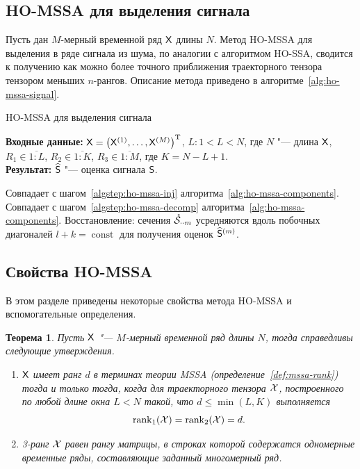 \documentclass[specialist,
  substylefile=spbu_report.rtx,
subf,href,colorlinks=true, 12pt]{disser}
\theoremstyle{plain}
\newtheorem{theorem}{Теорема}
\theoremstyle{definition}
\theoremstyle{remark}
\newcommand{\Input}{\textbf{Входные данные: }}
\newcommand{\Output}{\textbf{Результат: }}
\begin{document}
\subsection{HO-MSSA для выделения сигнала}
\label{subsec:ho-mssa-desc-signal}
Пусть дан $M$-мерный временной ряд $\mathsf{X}$ длины $N$.
Метод HO-MSSA для выделения в ряде сигнала из шума, по аналогии с
алгоритмом HO-SSA, сводится к получению как можно более точного
приближения траекторного тензора тензором меньших $n$-рангов.
Описание метода приведено в алгоритме~\ref{alg:ho-mssa-signal}.

\begin{algorithm}[!ht]
  \caption{HO-MSSA для выделения сигнала}
  \label{alg:ho-mssa-signal}
  \Input $\mathsf{X} = \left(\mathsf{X}^{(1)}, \ldots, \mathsf{X}^{(M)}\right)^{\mathrm{T}}$,
  $L: 1< L < N$, где $N$ "--- длина $\mathsf{X}$, $R_1 \in \overline{1:L}$,
  $R_2 \in \overline{1:K}$, $R_3 \in \overline{1:M}$, где $K = N-L+1$.\\
  \Output $\widehat{\mathsf{S}}$ "--- оценка сигнала $\mathsf{S}$.
  \begin{algorithmic}[1]
    \State Совпадает с шагом~\ref{algstep:ho-mssa-inj}
    алгоритма~\ref{alg:ho-mssa-components}.
    \State Совпадает с шагом~\ref{algstep:ho-mssa-decomp}
    алгоритма~\ref{alg:ho-mssa-components}.
    \State \label{algstep:ho-mssa-signal-reverse}
    Восстановление:
    сечения $\mathring{\mathcal{S}}_{\cdot\cdot m}$ усредняются вдоль
    побочных диагоналей $l + k = \operatorname{const}$ для
    получения оценок $\widehat{\mathsf{S}}^{(m)}$.
  \end{algorithmic}
\end{algorithm}

\subsection{Свойства HO-MSSA}
В этом разделе приведены некоторые свойства метода HO-MSSA и
вспомогательные определения.

\begin{theorem}
  \label{state:hosvd-mssa-rang}
  Пусть $\mathsf{X}$ "--- $M$-мерный временной ряд длины $N$, тогда
  справедливы следующие утверждения.
  \begin{enumerate}
    \item $\mathsf{X}$ имеет ранг $d$ в терминах теории \emph{MSSA}
      (определение~\ref{def:mssa-rank})
      тогда и только тогда, когда для траекторного тензора $\mathcal{X}$,
      построенного по любой длине окна
      $L<N$ такой, что $d \leqslant\min(L, K)$ выполняется
      \[\operatorname{rank}_1(\mathcal{X}) = \operatorname{rank}_2(\mathcal{X}) = d.\]
    \item 3-ранг $\mathcal{X}$ равен рангу матрицы,
      в строках которой содержатся одномерные временные ряды,
      составляющие заданный
      многомерный ряд.
  \end{enumerate}
\end{theorem}
\end{document}
